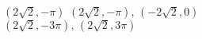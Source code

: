 { $\left( 2\sqrt{2}, -\pi \right)$ }
{$\left(2\sqrt{2}, -\pi \right), \, \left( -2\sqrt{2},0 \right)$\\$\left( 2\sqrt{2}, -3\pi \right), \, \left( 2\sqrt{2}, 3\pi \right)$\\ }
